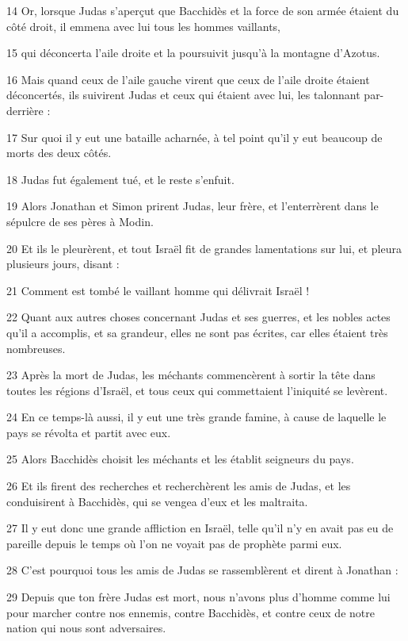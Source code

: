 \par 14 Or, lorsque Judas s'aperçut que Bacchidès et la force de son armée étaient du côté droit, il emmena avec lui tous les hommes vaillants,
\par 15 qui déconcerta l'aile droite et la poursuivit jusqu'à la montagne d'Azotus.
\par 16 Mais quand ceux de l'aile gauche virent que ceux de l'aile droite étaient déconcertés, ils suivirent Judas et ceux qui étaient avec lui, les talonnant par-derrière :
\par 17 Sur quoi il y eut une bataille acharnée, à tel point qu'il y eut beaucoup de morts des deux côtés.
\par 18 Judas fut également tué, et le reste s'enfuit.
\par 19 Alors Jonathan et Simon prirent Judas, leur frère, et l'enterrèrent dans le sépulcre de ses pères à Modin.
\par 20 Et ils le pleurèrent, et tout Israël fit de grandes lamentations sur lui, et pleura plusieurs jours, disant :
\par 21 Comment est tombé le vaillant homme qui délivrait Israël !
\par 22 Quant aux autres choses concernant Judas et ses guerres, et les nobles actes qu'il a accomplis, et sa grandeur, elles ne sont pas écrites, car elles étaient très nombreuses.
\par 23 Après la mort de Judas, les méchants commencèrent à sortir la tête dans toutes les régions d'Israël, et tous ceux qui commettaient l'iniquité se levèrent.
\par 24 En ce temps-là aussi, il y eut une très grande famine, à cause de laquelle le pays se révolta et partit avec eux.
\par 25 Alors Bacchidès choisit les méchants et les établit seigneurs du pays.
\par 26 Et ils firent des recherches et recherchèrent les amis de Judas, et les conduisirent à Bacchidès, qui se vengea d'eux et les maltraita.
\par 27 Il y eut donc une grande affliction en Israël, telle qu'il n'y en avait pas eu de pareille depuis le temps où l'on ne voyait pas de prophète parmi eux.
\par 28 C'est pourquoi tous les amis de Judas se rassemblèrent et dirent à Jonathan :
\par 29 Depuis que ton frère Judas est mort, nous n'avons plus d'homme comme lui pour marcher contre nos ennemis, contre Bacchidès, et contre ceux de notre nation qui nous sont adversaires.
